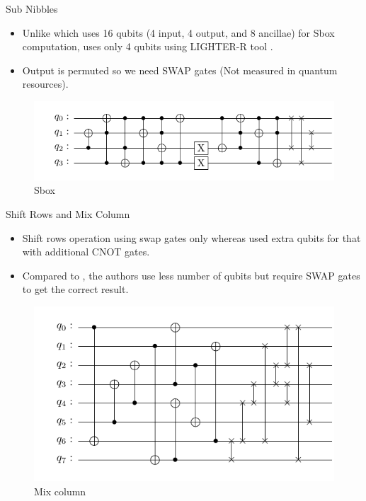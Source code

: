 \begin{frame}{Sub Nibbles}
    \begin{itemize}
        \item Unlike \cite{Almazrooie} which uses 16 qubits (4 input, 4 output, and 8 ancillae) for Sbox computation, \cite{Jang} uses only 4 qubits using LIGHTER-R tool \cite{LighterR}.
        \pause
        \item Output is permuted so we need SWAP gates (Not measured in quantum resources).
    \end{itemize}
    
    \begin{figure}[h!]
        \centering
        \includegraphics[width=1\linewidth]{saes21/sbox.pdf}
        \caption{Sbox}
        \label{fig:sb21}
    \end{figure}
\end{frame}
\begin{frame}{Shift Rows and Mix Column}
\begin{itemize}
    \item Shift rows operation using swap gates only whereas \cite{Almazrooie} used extra qubits for that with additional CNOT gates.
    \pause
    \item Compared to \cite{Almazrooie}, the authors use less number of qubits but require SWAP gates to get the correct result.
\end{itemize}
\begin{figure}[h!]
    \centering
    \includegraphics[width=0.7\linewidth]{saes21/mc.pdf}
    \caption{Mix column}
    \label{fig:mc21}
\end{figure}
\end{frame}
